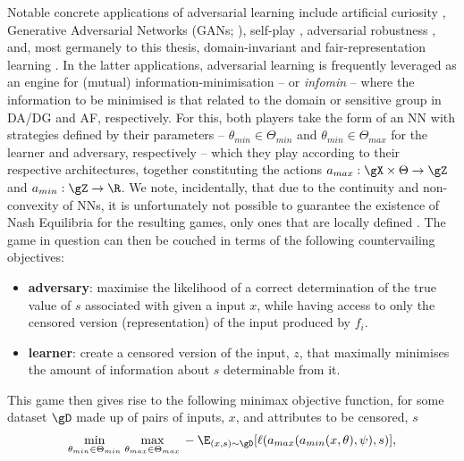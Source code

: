 Notable concrete applications of adversarial learning include artificial curiosity
\citep{schmidhuber1992learning}, Generative Adversarial Networks (GANs;
\cite{goodfellow14generative}), self-play \citep{silver2018general}, adversarial robustness
\citep{szegedy2013intriguing}, and, most germanely to this thesis, domain-invariant
\citep{ganin2016domain, zhao2019learning} and fair-representation learning
\citep{edwards2015censoring, madras2018learning}.
%
%
In the latter applications, adversarial learning is frequently leveraged as an engine for
(mutual) information-minimisation -- or \emph{infomin} -- where the information to be minimised is that
related to the domain or sensitive group in DA/DG and AF, respectively.
%
For this, both players take the form of an NN with strategies defined by their parameters --
\(\theta_{min} \in \Theta_{min}\) and \(\theta_{min} \in \Theta_{max}\) for the learner and
adversary, respectively -- which they play according to their respective architectures, together
constituting the actions \(a_{max}: \gX \times \Theta \to \gZ \) and \(a_{min}: \gZ \time \Psi \to
\R \).
%
We note, incidentally, that due to the continuity and non-convexity of NNs, it is unfortunately not
possible to guarantee the existence of Nash Equilibria for the resulting games, only ones that are
locally defined \citep{unterthiner2018coulomb}.
%
The game in question can then be couched in terms of the following countervailing objectives:
%
\begin{itemize}
  \item \textbf{adversary}: maximise the likelihood of a correct determination of the true value of
    \(s\) associated with given a input \(x\), while having access to only the censored version
    (representation) of the input produced by \(f_i\).
  \item \textbf{learner}: create a censored version of the input, \(z\), that maximally minimises the
    amount of information about \(s\) determinable from it. 
\end{itemize}
%
This game then gives rise to the following minimax objective function, for some dataset \(\gD\)
made up of pairs of inputs, \(x\), and attributes to be censored, \(s\)
%
\begin{align}
  \underset{\theta_{min} \in \Theta_{min}}{\text{min}}\; \underset{\theta_{max} \in
  \Theta_{max}}{\text{max}}\,
%
-\E_{(x, s) \sim \gD} [ \ell(a_{max}( a_{min}(x, \theta), \psi ), s ) ],
%
\label{eq:adv-infomin}
\end{align}
